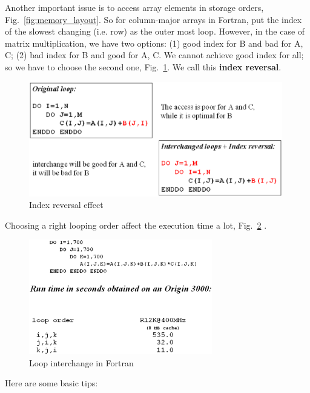 Another important issue is to access array elements in storage orders,
Fig.~\ref{fig:memory_layout}. So for column-major arrays in Fortran,
put the index of the slowest changing (i.e. row) as the outer most
loop. However, in the case of matrix multiplication, we have two
options: (1) good index for B and bad for A, C; (2) bad index for B
and good for A, C. We cannot achieve good index for all; so we have to
choose the second one, Fig.~\ref{fig:index_matrix_mul}. We call this
{\bf index reversal}. 

\begin{figure}[hbt]
  \centerline{\includegraphics[height=5cm,
    angle=0]{./images/index_matrix_mul.eps}}
  \caption{Index reversal effect}
  \label{fig:index_matrix_mul}
\end{figure}

Choosing a right looping order affect the execution time a lot,
Fig.~\ref{fig:loop_interchange} .
\begin{figure}[hbt]
  \centerline{\includegraphics[height=5cm,
    angle=0]{./images/loop_interchange.eps}}
  \caption{Loop interchange in Fortran}
  \label{fig:loop_interchange}
\end{figure}



Here are some basic tips:

